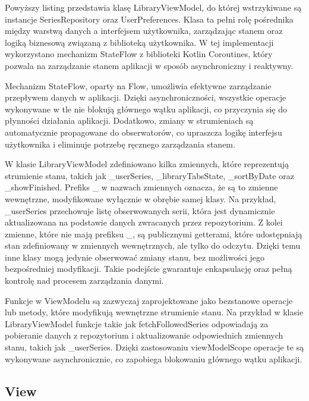 \documentclass[12pt,twoside]{article}
\begin{document}
Powyższy listing przedstawia klasę LibraryViewModel, do której wstrzykiwane są instancje SeriesRepository oraz 
UserPreferences. Klasa ta pełni rolę pośrednika między warstwą danych a interfejsem użytkownika, zarządzając 
stanem oraz logiką biznesową związaną z biblioteką użytkownika. W tej implementacji wykorzystano mechanizm 
StateFlow z biblioteki Kotlin Coroutines, który pozwala na zarządzanie stanem aplikacji w sposób asynchroniczny 
i reaktywny.

Mechanizm StateFlow, oparty na Flow, umożliwia efektywne zarządzanie przepływem danych w aplikacji. Dzięki 
asynchroniczności, wszystkie operacje wykonywane w tle nie blokują głównego wątku aplikacji, co przyczynia się 
do płynności działania aplikacji. Dodatkowo, zmiany w strumieniach są automatycznie propagowane do obserwatorów, 
co upraszcza logikę interfejsu użytkownika i eliminuje potrzebę ręcznego zarządzania stanem.

W klasie LibraryViewModel zdefiniowano kilka zmiennych, które reprezentują strumienie stanu, takich jak 
\_userSeries, \_libraryTabsState, \_sortByDate oraz \_showFinished. Prefiks \_ w nazwach zmiennych oznacza, że 
są to zmienne wewnętrzne, modyfikowane wyłącznie w obrębie samej klasy. Na przykład, \_userSeries przechowuje 
listę obserwowanych serii, która jest dynamicznie aktualizowana na podstawie danych zwracanych przez 
repozytorium. Z kolei zmienne, które nie mają prefiksu \_, są publicznymi getterami, które 
udostępniają stan zdefiniowany w zmiennych wewnętrznych, ale tylko do odczytu. Dzięki temu inne klasy mogą 
jedynie obserwować zmiany stanu, bez możliwości jego bezpośredniej modyfikacji. Takie podejście gwarantuje 
enkapsulację oraz pełną kontrolę nad procesem zarządzania danymi.

Funkcje w ViewModelu są zazwyczaj zaprojektowane jako bezstanowe operacje lub metody, które modyfikują 
wewnętrzne strumienie stanu. Na przykład w klasie LibraryViewModel funkcje takie jak fetchFollowedSeries 
odpowiadają za pobieranie danych z repozytorium i aktualizowanie odpowiednich zmiennych stanu, takich jak 
\_userSeries. Dzięki zastosowaniu viewModelScope operacje te są wykonywane asynchronicznie, co zapobiega 
blokowaniu głównego wątku aplikacji.

\subsection{View}
\end{document}
